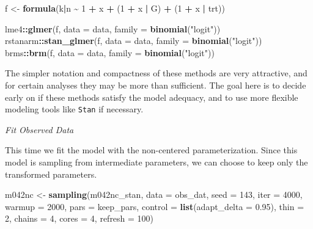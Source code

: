 \documentclass[11pt, oneside, openany]{scrbook}
\newenvironment{Shaded}{\begin{snugshade}}{\end{snugshade}}
\newcommand{\AttributeTok}[1]{\textcolor[rgb]{0.13,0.29,0.53}{#1}}
\newcommand{\DecValTok}[1]{\textcolor[rgb]{0.00,0.00,0.81}{#1}}
\newcommand{\FloatTok}[1]{\textcolor[rgb]{0.00,0.00,0.81}{#1}}
\newcommand{\FunctionTok}[1]{\textcolor[rgb]{0.13,0.29,0.53}{\textbf{#1}}}
\newcommand{\NormalTok}[1]{#1}
\newcommand{\OtherTok}[1]{\textcolor[rgb]{0.56,0.35,0.01}{#1}}
\newcommand{\SpecialCharTok}[1]{\textcolor[rgb]{0.81,0.36,0.00}{\textbf{#1}}}
\newcommand{\StringTok}[1]{\textcolor[rgb]{0.31,0.60,0.02}{#1}}
\begin{document}
\begin{Shaded}
\begin{Highlighting}[]
\NormalTok{f }\OtherTok{\textless{}{-}} \FunctionTok{formula}\NormalTok{(k}\SpecialCharTok{|}\NormalTok{n }\SpecialCharTok{\textasciitilde{}} \DecValTok{1} \SpecialCharTok{+}\NormalTok{ x }\SpecialCharTok{+}\NormalTok{ (}\DecValTok{1} \SpecialCharTok{+}\NormalTok{ x }\SpecialCharTok{|}\NormalTok{ G) }\SpecialCharTok{+}\NormalTok{ (}\DecValTok{1} \SpecialCharTok{+}\NormalTok{ x }\SpecialCharTok{|}\NormalTok{ trt))}

\NormalTok{lme4}\SpecialCharTok{::}\FunctionTok{glmer}\NormalTok{(f, }\AttributeTok{data =}\NormalTok{ data, }\AttributeTok{family =} \FunctionTok{binomial}\NormalTok{(}\StringTok{"logit"}\NormalTok{))}
\NormalTok{rstanarm}\SpecialCharTok{::}\FunctionTok{stan\_glmer}\NormalTok{(f, }\AttributeTok{data =}\NormalTok{ data, }\AttributeTok{family =} \FunctionTok{binomial}\NormalTok{(}\StringTok{"logit"}\NormalTok{))}
\NormalTok{brms}\SpecialCharTok{::}\FunctionTok{brm}\NormalTok{(f, }\AttributeTok{data =}\NormalTok{ data, }\AttributeTok{family =} \FunctionTok{binomial}\NormalTok{(}\StringTok{"logit"}\NormalTok{))}
\end{Highlighting}
\end{Shaded}


The simpler notation and compactness of these methods are very attractive, and for certain analyses they may be more than sufficient. The goal here is to decide early on if these methods satisfy the model adequacy, and to use more flexible modeling tools like \texttt{Stan} if necessary.

\emph{Fit Observed Data}

This time we fit the model with the non-centered parameterization. Since this model is sampling from intermediate parameters, we can choose to keep only the transformed parameters.


\begin{Shaded}
\begin{Highlighting}[]
\NormalTok{m042nc }\OtherTok{\textless{}{-}} \FunctionTok{sampling}\NormalTok{(m042nc\_stan, }\AttributeTok{data =}\NormalTok{ obs\_dat, }\AttributeTok{seed =} \DecValTok{143}\NormalTok{,}
                   \AttributeTok{iter =} \DecValTok{4000}\NormalTok{, }\AttributeTok{warmup =} \DecValTok{2000}\NormalTok{, }\AttributeTok{pars =}\NormalTok{ keep\_pars,}
                   \AttributeTok{control =} \FunctionTok{list}\NormalTok{(}\AttributeTok{adapt\_delta =} \FloatTok{0.95}\NormalTok{), }\AttributeTok{thin =} \DecValTok{2}\NormalTok{,}
                   \AttributeTok{chains =} \DecValTok{4}\NormalTok{, }\AttributeTok{cores =} \DecValTok{4}\NormalTok{, }\AttributeTok{refresh =} \DecValTok{100}\NormalTok{)}
\end{Highlighting}
\end{Shaded}
\end{document}
